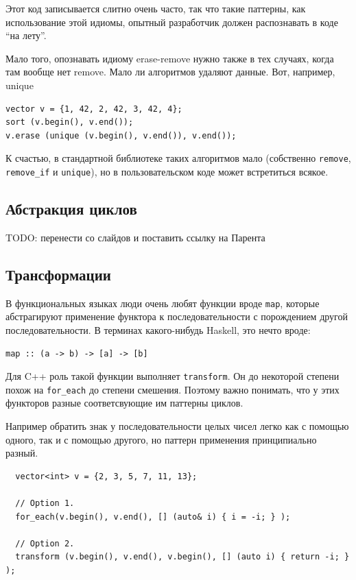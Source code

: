 \documentclass[a4paper,12pt,oneside]{book}
\begin{document}
Этот код записывается слитно очень часто, так что такие паттерны, как использование этой идиомы, опытный разработчик должен распознавать в коде ``на лету''.

Мало того, опознавать идиому erase-remove нужно также в тех случаях, когда там вообще нет remove. Мало ли алгоритмов удаляют данные. Вот, например, unique

\begin{lstlisting}
vector v = {1, 42, 2, 42, 3, 42, 4};
sort (v.begin(), v.end());
v.erase (unique (v.begin(), v.end()), v.end());
\end{lstlisting}

К счастью, в стандартной библиотеке таких алгоритмов мало (собственно \lstinline!remove!, \lstinline!remove_if! и \lstinline!unique!), но в пользовательском коде может встретиться всякое.

\subsection{Абстракция циклов}

TODO: перенести со слайдов и поставить ссылку на Парента \cite{talk:parent:seasoning}

\subsection{Трансформации}

В функциональных языках люди очень любят функции вроде \lstinline!map!, которые абстрагируют применение функтора к последовательности с порождением другой последовательности. В терминах какого-нибудь Haskell, это нечто вроде:

\begin{verbatim}
map :: (a -> b) -> [a] -> [b]
\end{verbatim}

Для C++ роль такой функции выполняет \lstinline!transform!. Он до некоторой степени похож на \lstinline!for_each! до степени смешения. Поэтому важно понимать, что у этих функторов разные соответсвующие им паттерны циклов.

Например обратить знак у последовательности целых чисел легко как с помощью одного, так и с помощью другого, но паттерн применения принципиально разный.

\begin{lstlisting}
  vector<int> v = {2, 3, 5, 7, 11, 13};

  // Option 1.
  for_each(v.begin(), v.end(), [] (auto& i) { i = -i; } );

  // Option 2.
  transform (v.begin(), v.end(), v.begin(), [] (auto i) { return -i; } );
\end{lstlisting}
\end{document}

